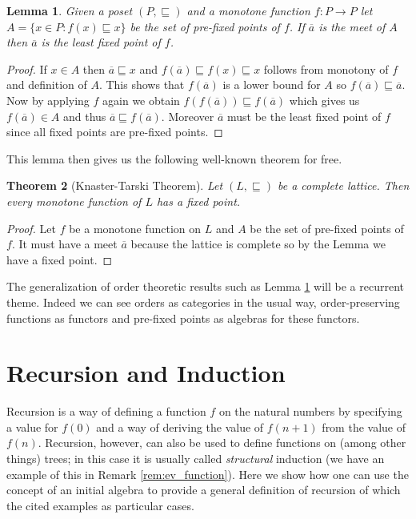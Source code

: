 \documentclass[letterpaper, 11pt, oneside]{memoir}
\theoremstyle{myteo}
\newtheorem{theorem}{Theorem}[section]
\newtheorem{lemma}[theorem]{Lemma}
\numberwithin{equation}{section}
\begin{document}
\begin{lemma}
  \label{lemma:order_theory}
  Given a poset \((P, \sqsubseteq)\) and a monotone function \(f \colon P \to P\) let \(A = \{x \in P \colon f(x) \sqsubseteq x\}\) be the set of pre-fixed points of \(f\).
  If \(\overline{a}\) is the meet of \(A\) then \(\overline{a}\) is the least fixed point of \(f\).
\end{lemma}

\begin{proof}
  If \(x \in A\) then \(\overline{a} \sqsubseteq x\) and \(f(\overline{a}) \sqsubseteq f(x) \sqsubseteq x\) follows from monotony of \(f\) and definition of \(A\).
  This shows that \(f(\overline{a})\) is a lower bound for \(A\) so \(f(\overline{a}) \sqsubseteq \overline{a}\).
  Now by applying \(f\) again we obtain \(f(f(\overline{a})) \sqsubseteq f(\overline{a})\) which gives us \(f(\overline{a}) \in A\) and thus \(\overline{a} \sqsubseteq f(\overline{a})\).
  Moreover \(\overline{a}\) must be the least fixed point of \(f\) since all fixed points are pre-fixed points.
\end{proof}

This lemma then gives us the following well-known theorem for free.

\begin{theorem}[Knaster-Tarski Theorem]
  Let \((L, \sqsubseteq)\) be a complete lattice.
  Then every monotone function of \(L\) has a fixed point.
\end{theorem}

\begin{proof}
  Let \(f\) be a monotone function on \(L\) and \(A\) be the set of pre-fixed points of \(f\).
  It must have a meet \(\overline{a}\) because the lattice is complete so by the Lemma we have a fixed point.
\end{proof}

The generalization of order theoretic results such as Lemma \ref{lemma:order_theory} will be a recurrent theme.
Indeed we can see orders as categories in the usual way, order-preserving functions as functors and pre-fixed points as algebras for these functors.

\section{Recursion and Induction}

Recursion is a way of defining a function \(f\) on the natural numbers by specifying a value for \(f(0)\) and a way of deriving the value of \(f(n + 1)\) from the value of \(f(n)\).
Recursion, however, can also be used to define functions on (among other things) trees; in this case it is usually called \emph{structural} induction (we have an example of this in Remark \ref{rem:ev_function}).
Here we show how one can use the concept of an initial algebra to provide a general definition of recursion of which the cited examples as particular cases.
\end{document}
